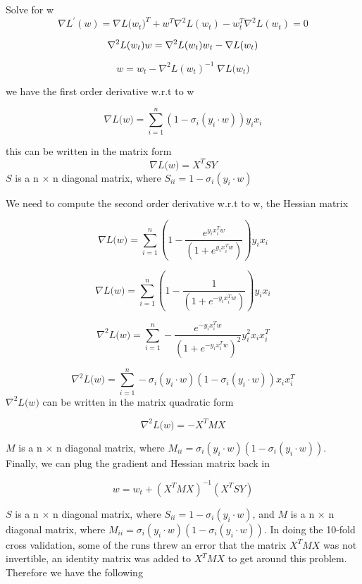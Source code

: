 \documentclass[11pt]{report}
\begin{document}
\justify Solve for w
\[
\nabla{L^{'}(w)} =  \nabla{L(w_{t}})^{T} + w^{T} \nabla^{2}{L(w_{t})} - w_{t}^{T} \nabla^{2}{L(w_{t})} = 0
\]

\[
\nabla^{2}{L(w_{t})}  w =   \nabla^{2}{L(w_{t})} w_{t} - \nabla{L(w_{t}})  \\
\]

\[
w=  w_{t} - \nabla^{2}{L(w_{t})}^{-1} \; \nabla{L(w_{t}}) 
\]

\justify we have the first order derivative w.r.t to w 

\[
\nabla{L(w}) = \sum_{i=1}^{n} (1 - \sigma_{i}(y_{i} \cdot w)) y_{i} x_{i}
\]

\justify this can be written in the matrix form
\[
\nabla{L(w}) = X^{T}SY
\]
$S$ is a n $\times$ n diagonal matrix, where $S_{ii} = 1 - \sigma_{i} ({y_{i} \cdot w})$

\-
\justify We need to compute the second order derivative w.r.t to w, the Hessian matrix

\[
\nabla{L(w}) = \sum_{i=1}^{n} (1 - \frac{e^{y_{i} x_{i}^{T} w}} {(1 + e^{y_{i} x_{i}^{T} w})} ) y_{i} x_{i}
\]

\[
\nabla{L(w}) = \sum_{i=1}^{n} ( 1 - \frac{1} {(1 + e^{-y_{i} x_{i}^{T} w})} ) y_{i} x_{i}
\]

\[
\nabla^{2}{L(w}) = \sum_{i=1}^{n} - \frac{ e^{-y_{i} x_{i}^{T} w } } {(1 + e^{-y_{i} x_{i}^{T} w})^{2}}  y_{i}^{2} x_{i} x_{i}^{T}
\]

\[
\nabla^{2}{L(w}) = \sum_{i=1}^{n} - \sigma_{i} ({y_{i} \cdot w})( 1 - \sigma_{i} ({y_{i} \cdot w})) x_{i} x_{i}^{T}
\]
\-
\justify $\nabla^{2}{L(w})$ can be written in the matrix quadratic form 

\-

\[
\nabla^{2}{L(w}) = - X^{T} M X
\]

\-

$M$ is a n $\times$ n diagonal matrix, where $M_{ii} = \sigma_{i} ({y_{i} \cdot w})( 1 - \sigma_{i} ({y_{i} \cdot w}))$. Finally, we can plug the gradient and Hessian matrix back in

\-

\[
w =  w_{t} + (X^{T} M X)^{-1} (X^{T}SY)
\]

\-

\justify $S$ is a n $\times$ n diagonal matrix, where $S_{ii} = 1 - \sigma_{i} ({y_{i} \cdot w})$,  and $M$ is a n $\times$ n diagonal matrix, where $M_{ii} = \sigma_{i} ({y_{i} \cdot w})( 1 - \sigma_{i} ({y_{i} \cdot w}))$. In doing the 10-fold cross validation, some of the runs threw an error that the matrix $X^{T} M X$ was not invertible, an identity matrix was added to $X^{T} M X$ to get around this problem. Therefore we have the following
\end{document}
